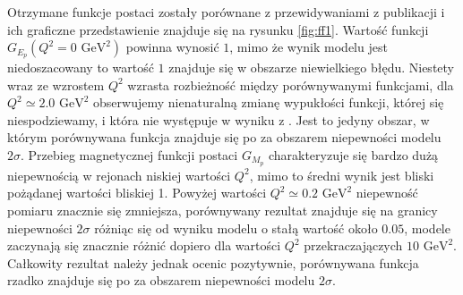 \documentclass[11pt]{book}
\theoremstyle{definition}
\begin{document}
Otrzymane funkcje postaci zostały porównane z przewidywaniami z publikacji \cite{2009PhRvC..79f5204A} i ich graficzne przedstawienie znajduje się na rysunku \ref{fig:ff1}. Wartość funkcji $G_{E_p}\left(Q^2=0\text{ GeV}^2\right)$ powinna wynosić $1$, mimo że wynik modelu jest niedoszacowany to wartość $1$ znajduje się w obszarze niewielkiego błędu. Niestety wraz ze wzrostem $Q^2$ wzrasta rozbieżność między porównywanymi funkcjami, dla $Q^2 \simeq 2.0\text{ GeV}^2$ obserwujemy nienaturalną zmianę wypukłości funkcji, której się niespodziewamy, i która nie występuje w wyniku z \cite{2009PhRvC..79f5204A}. Jest to jedyny obszar, w którym porównywana funkcja znajduje się po za obszarem niepewności modelu $2\sigma$. Przebieg magnetycznej funkcji postaci $G_{M_p}$ charakteryzuje się bardzo dużą niepewnością w rejonach niskiej wartości $Q^2$, mimo to średni wynik jest bliski pożądanej wartości bliskiej 1. Powyżej wartości $Q^2 \simeq 0.2\text{ GeV}^2$ niepewność pomiaru znacznie się zmniejsza, porównywany rezultat znajduje się na granicy niepewności $2\sigma$ różniąc się od wyniku modelu o stałą wartość około $0.05$, modele zaczynają się znacznie różnić dopiero dla wartości $Q^2$ przekraczajączych $10 \text{ GeV}^2$. Całkowity rezultat należy jednak ocenic pozytywnie, porównywana funkcja rzadko znajduje się po za obszarem niepewności modelu $2\sigma$. 



%
	
	
\end{document}
